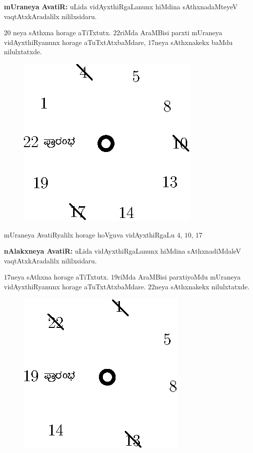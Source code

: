 {\bf mUraneya AvatiR:} uLida vidAyxthiRgaLanunx hiMdina sAthxnadaMteyeV vaqtAtxkAradalilx nililxsidaru.

$20$ neya sAthxna horage aTiTxtutx. $22$riMda AraMBisi parxti mUraneya vidAyxthiRyanunx horage aTuTxtAtxbaMdare, $17$neya sAthxnakekx baMdu nilulxtatxde. 
\begin{figure}[H]
\centering
\includegraphics[scale=0.8]{src/figures/fig11.eps}
\end{figure}

mUraneya AvatiRyalilx horage hoVguva vidAyxthiRgaLu $4$, $10$, $17$ 

{\bf nAlakxneya AvatiR:} uLida vidAyxthiRgaLanunx hiMdina sAthxnadiMdaleV vaqtAtxkAradalilx nililxsidaru.

$17$neya sAthxna horage aTiTxtutx. $19$riMda AraMBisi parxtiyoMdu mUraneya vidAyxthiRyanunx horage aTuTxtAtxbaMdare. $22$neya sAthxnakekx nilulxtatxde. 
\begin{figure}[H]
\centering
\includegraphics[scale=0.8]{src/figures/fig12.eps}
\end{figure}

